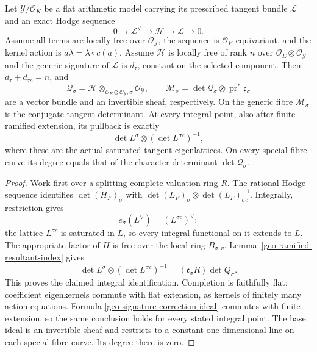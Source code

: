 \begin{proposition}\label{geo-ramified-hodge-determinant}
Let $\mathcal Y/\mathcal O_K$ be a flat arithmetic model carrying
its prescribed tangent bundle $\mathcal L$ and an exact Hodge sequence
\[
 0\longrightarrow\mathcal L^\vee\longrightarrow\mathcal H
   \longrightarrow\mathcal L\longrightarrow0.
\]
Assume all terms are locally free over $\mathcal O_{\mathcal Y}$,
the sequence is $\mathcal O_E$-equivariant, and the kernel action is
$a\lambda=\lambda\circ c(a)$.
Assume $\mathcal H$ is locally free of rank $n$ over
$\mathcal O_E\otimes\mathcal O_{\mathcal Y}$ and the generic
signature of $\mathcal L$ is $d_\tau$, constant on the selected
component. Then $d_\tau+d_{\tau c}=n$, and
\begin{equation}\label{geo-actual-integral-determinant}
 \mathcal Q_\sigma
   =\mathcal H\otimes_{\mathcal O_E\otimes\mathcal O_{\mathcal Y},\sigma}
                      \mathcal O_{\mathcal Y},
 \qquad
 \mathcal M_\sigma
   =\det\mathcal Q_\sigma\otimes
                         \operatorname{pr}^*\mathfrak c_\sigma
\end{equation}
are a vector bundle and an invertible sheaf, respectively.
On the generic fibre $\mathcal M_\sigma$ is the conjugate tangent
determinant. At every integral point, also after finite ramified
extension, its pullback is exactly
\[
 \det L^\sigma\otimes(\det L^{\sigma c})^{-1},
\]
where these are the actual saturated tangent eigenlattices.
On every special-fibre curve its degree equals that of the character
determinant $\det\mathcal Q_\sigma$.
\end{proposition}
\begin{proof}
Work first over a splitting complete valuation ring $R$.
The rational Hodge sequence identifies
$\det(H_F)_\sigma$ with
$\det(L_F)_\sigma\otimes\det(L_F)_{\sigma c}^{-1}$.
Integrally, restriction gives
\[
 e_\sigma(L^\vee)=(L^{\sigma c})^\vee:
\]
the lattice $L^{\sigma c}$ is saturated in $L$, so every integral
functional on it extends to $L$. The appropriate factor of $H$ is
free over the local ring $B_{\sigma,v}$.
Lemma~\ref{geo-ramified-resultant-index} gives
\[
 \det L^\sigma\otimes(\det L^{\sigma c})^{-1}
      =(\mathfrak c_\sigma R)\det Q_\sigma.
\]
This proves the claimed integral identification. Completion is
faithfully flat; coefficient eigenkernels commute with flat extension,
as kernels of finitely many action equations. Formula
\eqref{geo-signature-correction-ideal} commutes with finite extension,
so the same conclusion holds for every stated integral point.
The base ideal is an invertible sheaf and restricts to a constant
one-dimensional line on each special-fibre curve. Its degree there
is zero.
\end{proof}

